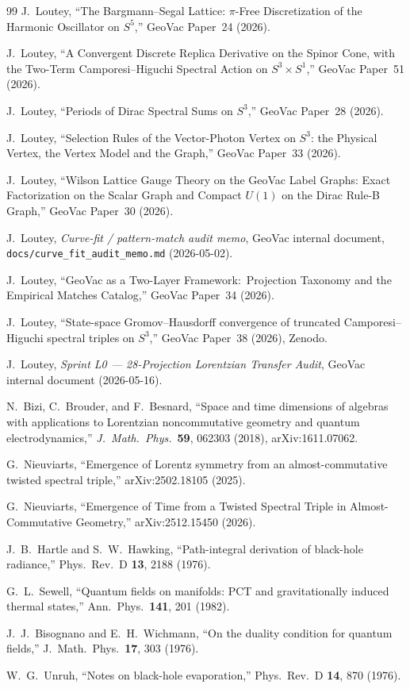 \documentclass[twocolumn,pra,amsmath,amssymb,superscriptaddress]{revtex4-2}
\begin{document}
\begin{thebibliography}{99}
J.~Loutey,
``The Bargmann--Segal Lattice: $\pi$-Free Discretization of the
Harmonic Oscillator on $S^5$,''
GeoVac Paper~24 (2026).

J.~Loutey,
``A Convergent Discrete Replica Derivative on the Spinor Cone, with
the Two-Term Camporesi--Higuchi Spectral Action on $S^3 \times S^1$,''
GeoVac Paper~51 (2026).

J.~Loutey,
``Periods of Dirac Spectral Sums on $S^3$,''
GeoVac Paper~28 (2026).

J.~Loutey,
``Selection Rules of the Vector-Photon Vertex on $S^3$: the Physical
Vertex, the Vertex Model and the Graph,''
GeoVac Paper~33 (2026).

J.~Loutey,
``Wilson Lattice Gauge Theory on the GeoVac Label Graphs: Exact
Factorization on the Scalar Graph and Compact $U(1)$ on the Dirac
Rule-B Graph,''
GeoVac Paper~30 (2026).

J.~Loutey,
\textit{Curve-fit / pattern-match audit memo},
GeoVac internal document, \texttt{docs/curve\_fit\_audit\_memo.md}
(2026-05-02).

J.~Loutey,
``GeoVac as a Two-Layer Framework:\ Projection Taxonomy and the
Empirical Matches Catalog,''
GeoVac Paper~34 (2026).

J.~Loutey,
``State-space Gromov--Hausdorff convergence of truncated
Camporesi--Higuchi spectral triples on $S^3$,''
GeoVac Paper~38 (2026), Zenodo.

J.~Loutey,
\textit{Sprint L0 --- 28-Projection Lorentzian Transfer Audit},
GeoVac internal document (2026-05-16).

N.~Bizi, C.~Brouder, and F.~Besnard,
``Space and time dimensions of algebras with applications to
Lorentzian noncommutative geometry and quantum electrodynamics,''
\textit{J.~Math.~Phys.}\ \textbf{59}, 062303 (2018), arXiv:1611.07062.

G.~Nieuviarts,
``Emergence of Lorentz symmetry from an almost-commutative twisted
spectral triple,''
arXiv:2502.18105 (2025).

G.~Nieuviarts,
``Emergence of Time from a Twisted Spectral Triple in
Almost-Commutative Geometry,''
arXiv:2512.15450 (2026).

J.~B.~Hartle and S.~W.~Hawking,
``Path-integral derivation of black-hole radiance,''
Phys.\ Rev.\ D \textbf{13}, 2188 (1976).

G.~L.~Sewell,
``Quantum fields on manifolds: PCT and gravitationally induced thermal
states,''
Ann.\ Phys.\ \textbf{141}, 201 (1982).

J.~J.~Bisognano and E.~H.~Wichmann,
``On the duality condition for quantum fields,''
J.\ Math.\ Phys.\ \textbf{17}, 303 (1976).

W.~G.~Unruh,
``Notes on black-hole evaporation,''
Phys.\ Rev.\ D \textbf{14}, 870 (1976).

\end{thebibliography}
\end{document}
